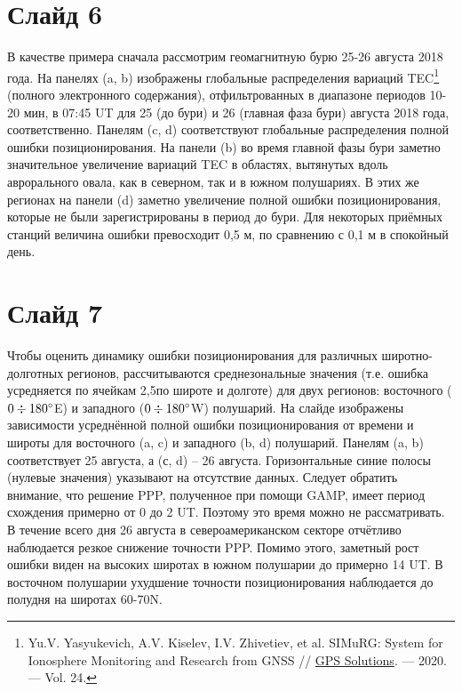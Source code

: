 \documentclass[a4paper,14pt]{extarticle}
\begin{document}
\section*{Слайд 6}
В качестве примера сначала рассмотрим геомагнитную бурю 25-26 августа 2018 года.
На панелях (a, b) изображены глобальные распределения вариаций TEC\footnote{Yu.V. Yasyukevich, A.V. Kiselev, I.V. Zhivetiev, et al. SIMuRG: System for Ionosphere Monitoring and Research from GNSS // \href{http://dx.doi.org/10.1007/s10291-020-00983-2}{GPS Solutions}. --- 2020. --- Vol. 24.} (полного электронного содержания), отфильтрованных в диапазоне периодов 10-20 мин, в 07:45 UT для 25 (до бури) и 26 (главная фаза бури) августа 2018 года, соответственно.
Панелям (c, d) соответствуют глобальные распределения полной ошибки позиционирования.  
На панели (b) во время главной фазы бури заметно значительное увеличение вариаций TEC в областях, вытянутых вдоль аврорального овала, как в северном, так и в южном полушариях.
В этих же регионах на панели (d) заметно увеличение полной ошибки позиционирования, которые не были зарегистрированы в период до бури.
Для некоторых приёмных станций величина ошибки превосходит 0,5 м, по сравнению с 0,1 м в спокойный день.

\section*{Слайд 7}
Чтобы оценить динамику ошибки позиционирования для различных широтно-долготных регионов, рассчитываются среднезональные значения (т.е. ошибка усредняется по ячейкам 2,5\degree по широте и долготе) для двух регионов: восточного ($0\div180\degree$E) и западного ($0\div180\degree$W) полушарий.
На слайде изображены зависимости усреднённой полной ошибки позиционирования от времени и широты для восточного (a, c) и западного (b, d) полушарий.
Панелям (a, b) соответствует 25 августа, а (с, d) -- 26 августа.
Горизонтальные синие полосы (нулевые значения) указывают на отсутствие данных.
Следует обратить внимание, что решение PPP, полученное при помощи GAMP, имеет период схождения примерно от 0 до 2 UT.
Поэтому это время можно не рассматривать.
В течение всего дня 26 августа в североамериканском секторе отчётливо наблюдается резкое снижение точности PPP.
Помимо этого, заметный рост ошибки виден на высоких широтах в южном полушарии до примерно 14 UT.
В восточном полушарии ухудшение точности позиционирования наблюдается до полудня на широтах 60-70\degree N.
\end{document}
